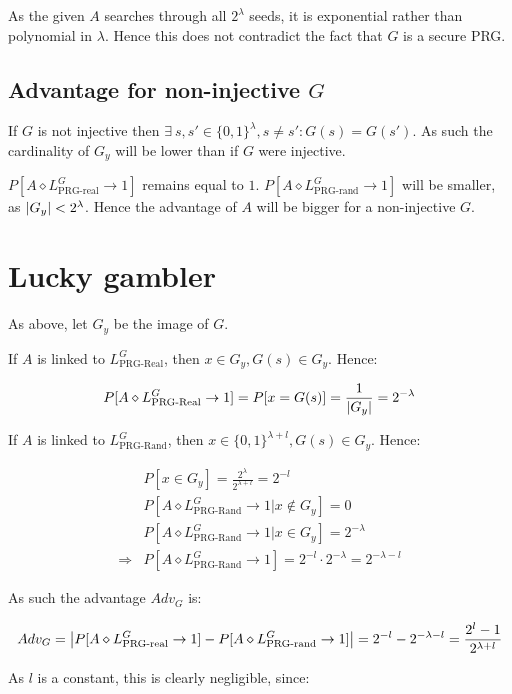 \documentclass[a4paper]{scrreprt}
\DeclarePairedDelimiter\abs{\lvert}{\rvert}
\begin{document}
As the given $A$ searches through all $2^\lambda$ seeds, it is exponential
rather than polynomial in $\lambda$. Hence this does not contradict the fact
that $G$ is a secure PRG.

\subsection{Advantage for non-injective $G$}

If $G$ is not injective then $\exists\ s, s' \in \{0, 1\}^\lambda, s \neq s':
G(s) = G(s')$. As such the cardinality of $G_y$ will be lower than if $G$ were
injective.

$P[A \diamond L^G_{\text{PRG-real}} \rightarrow 1]$ remains equal to $1$. $P[A
\diamond L^G_{\text{PRG-rand}} \rightarrow 1]$ will be smaller, as $\abs{G_y} <
2^\lambda$. Hence the advantage of $A$ will be bigger for a non-injective $G$.

\section{Lucky gambler}

As above, let $G_y$ be the image of $G$.

If $A$ is linked to $L^G_{\text{PRG-Real}}$, then $x \in G_y, G(s) \in G_y$. Hence:

\[
	P[A \diamond L^G_{\text{PRG-Real}} \rightarrow 1] = P[x = G(s)] = \frac{1}{\abs{G_y}} = 2^{-\lambda}
\]

If $A$ is linked to $L^G_{\text{PRG-Rand}}$, then $x \in \{0, 1\}^{\lambda + l}, G(s) \in G_y$. Hence:

\begin{align*}
	& P[x \in G_y] = \frac{2^\lambda}{2^{\lambda + l}} = 2^{-l} \\
	& P[A \diamond L^G_{\text{PRG-Rand}} \rightarrow 1 | x \not \in G_y] = 0 \\
	& P[A \diamond L^G_{\text{PRG-Rand}} \rightarrow 1 | x \in G_y] = 2^{-\lambda} \\
	\Rightarrow & P[A \diamond L^G_{\text{PRG-Rand}} \rightarrow 1] = 2^{-l} \cdot 2^{-\lambda} = 2^{-\lambda - l}
\end{align*}

As such the advantage $Adv_G$ is:

\[
	Adv_G = \abs*{P[A \diamond L^G_{\text{PRG-real}} \rightarrow 1] - P[A \diamond L^G_{\text{PRG-rand}} \rightarrow 1]} = 2^{-l} - 2^{-\lambda - l} = \frac{2^l - 1}{2^{\lambda +l}}
\]

As $l$ is a constant, this is clearly negligible, since:
\end{document}
